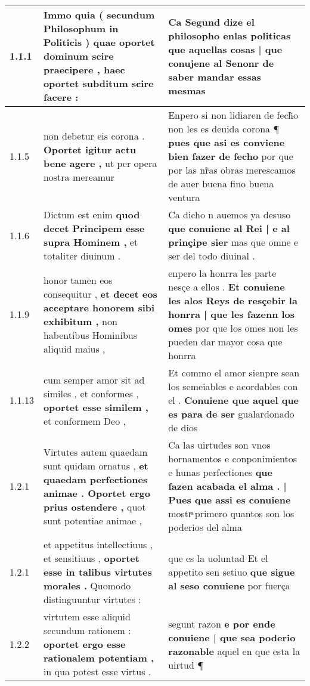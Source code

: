 \begin{tabular}{|p{1cm}|p{6.5cm}|p{6.5cm}|}

\hline
1.1.1 & Immo quia ( secundum Philosophum in Politicis ) \textbf{ quae oportet dominum scire praecipere , } haec oportet subditum scire facere : & Ca Segund dize el philosopho enlas politicas \textbf{ que aquellas cosas | que conujene al Senonr } de saber mandar essas mesmas \\\hline
1.1.5 & non debetur eis corona . \textbf{ Oportet igitur actu bene agere , } ut per opera nostra mereamur & Enpero si non lidiaren de fech̃o non les es deuida corona ¶ \textbf{ pues que asi es conviene bien fazer de fecho } por que por las nr̃as obras merescamos de auer buena fino buena ventura \\\hline
1.1.6 & Dictum est enim \textbf{ quod decet Principem esse supra Hominem , } et totaliter diuinum . & Ca dicho n auemos ya desuso \textbf{ que conuiene al Rei | e al prinçipe sier } mas que omne e ser del todo diuinal . \\\hline
1.1.9 & honor tamen eos consequitur , \textbf{ et decet eos acceptare honorem sibi exhibitum , } non habentibus Hominibus aliquid maius , & enpero la honrra les parte nesçe a ellos . \textbf{ Et conuiene les alos Reys de resçebir la honrra | que les fazenn los omes } por que los omes non les pueden dar mayor cosa que honrra \\\hline
1.1.13 & cum semper amor sit ad similes , et conformes , \textbf{ oportet esse similem , } et conformem Deo , & Et commo el amor sienpre sean los semeiables e acordables con el . \textbf{ Conuiene que aquel que es para de ser } gualardonado de dios \\\hline
1.2.1 & Virtutes autem quaedam sunt quidam ornatus , \textbf{ et quaedam perfectiones animae . Oportet ergo prius ostendere , } quot sunt potentiae animae , & Ca las uirtudes son vnos hornamentos e conponimientos e hunas perfectiones \textbf{ que fazen acabada el alma . | Pues que assi es conuiene } mostrͣ primero quantos son los poderios del alma \\\hline
1.2.1 & et appetitus intellectiuus , et sensitiuus , \textbf{ oportet esse in talibus virtutes morales . } Quomodo distinguuntur virtutes : & que es la uoluntad Et el appetito sen setiuo \textbf{ que sigue al seso conuiene } por fuerça \\\hline
1.2.2 & virtutem esse aliquid secundum rationem : \textbf{ oportet ergo esse rationalem potentiam , } in qua potest esse virtus . & segunt razon \textbf{ e por ende conuiene | que sea poderio razonable } aquel en que esta la uirtud ¶ \\\hline

\end{tabular}
